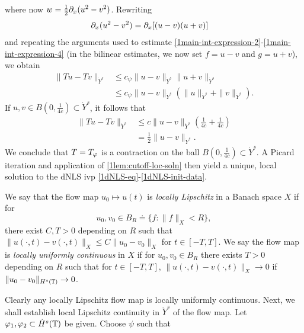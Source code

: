 %
where now $w = \frac{1}{2} \partial_x (u^2 - v^2)$. Rewriting
%
\begin{equation*}
	\begin{split}
	\partial_x(u^2 - v^2)	
		& = \partial_x[(u-v)(u+v)]
		\end{split}
\end{equation*}
%
and repeating the arguments used to estimate 
\eqref{1main-int-expression-2}-\eqref{1main-int-expression-4} (in the
bilinear estimates, we now set $f=u-v$ and $g = u+v$), we obtain
%
\begin{equation}
	\label{120a}
	\begin{split}
		\|Tu - Tv \|_{\dot{Y}^s}  
		& \le c_\psi \|u -v\|_{\dot{Y}^s} \|u + v \|_{\dot{Y}^s}
		\\
		& \le c_\psi \|u -v\|_{\dot{Y}^s} (\|u\|_{\dot{Y}^s}+ \|v \|_{\dot{Y}^s}).
	\end{split}
\end{equation}
%
If $u, v \in B(0, \frac{1}{4c}) \subset \dot{Y}^s$, it follows that
%
\begin{equation}
	\label{121a}
	\begin{split}
		\|Tu - Tv \|_{\dot{Y}^s}
		& \le c \|u -v \|_{\dot{Y}^s} \left( \frac{1}{4c} + 
		\frac{1}{4c} \right)
		\\
		& = \frac{1}{2} \|u -v \|_{\dot{Y}^s}. 
	\end{split}
\end{equation}
%
We conclude that $T = T_{\varphi}$ is a contraction on the ball $B(0, 
\frac{1}{4c}) \subset \dot{Y}^s$. A Picard iteration and application of 
\cref{1lem:cutoff-loc-soln} then yield a unique, local
solution to the dNLS ivp \eqref{1dNLS-eq}-\eqref{1dNLS-init-data}.
\begin{definition}
	We say that the flow map $u_0 \mapsto u(t)$ is \emph{locally Lipschitz} in a Banach
	space $X$ if for
	$$u_0, v_0 \in B_R \doteq \{f: \|f\|_X < R\},$$ there exist $C, T>0$
	depending on $R$ such that $\|u(\cdot, t) - v(\cdot, t)
	\|_X \le C \|u_{0} - v_0 \|_{X}$ for $t \in [-T, T]$. We
	say the flow map is \emph{locally uniformly
	continuous} in $X$ if for
	$u_0, v_0 \in B_R$ there exists $T >0$ depending on $R$ such that for
	$t \in [-T, T]$, $\|u(\cdot, t) - v(\cdot, t) \|_{X} \to
	0$ if $\|u_0 - v_0 \|_{H^{s}(\mathbb{T})} \to 0$. 
\end{definition}
%
%
Clearly any locally Lipschitz flow map is locally uniformly continuous. 
Next, we shall establish local Lipschitz continuity in $\dot{Y}^s$ of the flow
map. Let $\varphi_1, \varphi_2 \subset \dot{H}^s(\mathbb{T})$ be given. Choose $\psi$ such that
